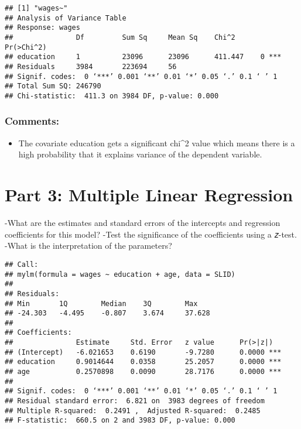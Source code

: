 \documentclass[
]{article}
\providecommand{\tightlist}{%
  \setlength{\itemsep}{0pt}\setlength{\parskip}{0pt}}
\begin{document}
\begin{verbatim}
## [1] "wages~"
## Analysis of Variance Table
## Response: wages
##               Df         Sum Sq     Mean Sq    Chi^2      Pr(>Chi^2) 
## education     1          23096      23096      411.447    0 ***      
## Residuals     3984       223694     56        
## Signif. codes:  0 ‘***’ 0.001 ‘**’ 0.01 ‘*’ 0.05 ‘.’ 0.1 ‘ ’ 1
## Total Sum SQ: 246790 
## Chi-statistic:  411.3 on 3984 DF, p-value: 0.000
\end{verbatim}

\hypertarget{comments-1}{%
\subsubsection{Comments:}\label{comments-1}}

\begin{itemize}
\tightlist
\item
  The covariate education gets a significant chi\^{}2 value which means
  there is a high probability that it explains variance of the dependent
  variable.
\end{itemize}

\hypertarget{part-3-multiple-linear-regression}{%
\section{Part 3: Multiple Linear
Regression}\label{part-3-multiple-linear-regression}}

-What are the estimates and standard errors of the intercepts and
regression coefficients for this model? -Test the significance of the
coefficients using a 𝑧-test. -What is the interpretation of the
parameters?

\begin{verbatim}
## Call:
## mylm(formula = wages ~ education + age, data = SLID)
## 
## Residuals:
## Min       1Q        Median    3Q        Max       
## -24.303   -4.495    -0.807    3.674     37.628    
## 
## Coefficients:
##               Estimate     Std. Error   z value      Pr(>|z|)     
## (Intercept)   -6.021653    0.6190       -9.7280      0.0000 ***   
## education     0.9014644    0.0358       25.2057      0.0000 ***   
## age           0.2570898    0.0090       28.7176      0.0000 ***   
## 
## Signif. codes:  0 ‘***’ 0.001 ‘**’ 0.01 ‘*’ 0.05 ‘.’ 0.1 ‘ ’ 1
## Residual standard error:  6.821 on  3983 degrees of freedom 
## Multiple R-squared:  0.2491 ,  Adjusted R-squared:  0.2485 
## F-statistic:  660.5 on 2 and 3983 DF, p-value: 0.000
\end{verbatim}
\end{document}
